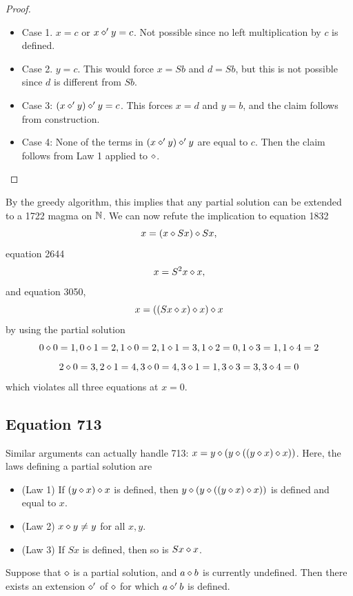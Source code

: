 \begin{proof}
\begin{itemize}
\item Case 1.  $x=c$ or $x \diamond' y = c$.  Not possible since no left multiplication by $c$ is defined.
\item Case 2.  $y=c$.  This would force $x = Sb$ and $d = Sb$, but this is not possible since $d$ is different from $Sb$.
\item Case 3: $(x \diamond' y) \diamond' y = c$. This forces $x=d$ and $y=b$, and the claim follows from construction.
\item Case 4: None of the terms in $(x \diamond' y) \diamond' y$ are equal to $c$.  Then the claim follows from Law 1 applied to $\diamond$.
\end{itemize}
\end{proof}

By the greedy algorithm, this implies that any partial solution can be extended to a 1722 magma on $\mathbb{N}$.  We can now refute the implication to equation 1832
$$ x = (x \diamond Sx) \diamond Sx,$$
equation 2644
$$ x = S^2 x \diamond x,$$
and equation 3050,
$$ x = ((Sx \diamond x) \diamond x) \diamond x$$
by using the partial solution
$$ 0 \diamond 0 = 1, 0 \diamond 1 = 2, 1 \diamond 0 = 2, 1 \diamond 1 = 3, 1 \diamond 2 = 0, 1 \diamond 3 = 1, 1 \diamond 4 = 2$$
$$ 2 \diamond 0 = 3, 2 \diamond 1 = 4, 3 \diamond 0 = 4, 3 \diamond 1 = 1, 3 \diamond 3 = 3, 3 \diamond 4 = 0$$
which violates all three equations at $x=0$.

\subsection{Equation 713}

Similar arguments can actually handle 713: $x = y \diamond (y \diamond ((y \diamond x) \diamond x))$. Here, the laws defining a partial solution are
\begin{itemize}
\item (Law 1) If $(y \diamond x) \diamond x$ is defined, then $y \diamond (y \diamond ((y \diamond x) \diamond x))$ is defined and equal to $x$.
\item (Law 2) $x \diamond y \neq y$ for all $x,y$.
\item (Law 3) If $Sx$ is defined, then so is $Sx \diamond x$.
\end{itemize}

\begin{lemma}[713 extension]\label{713-extension}\leanok{}  Suppose that $\diamond$ is a partial solution, and $a \diamond b$ is currently undefined.  Then there exists an extension $\diamond'$ of $\diamond$ for which $a \diamond' b$ is defined.
\end{lemma}

